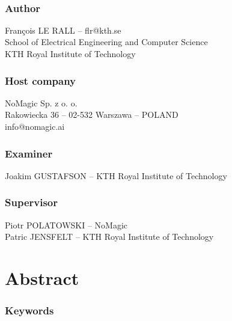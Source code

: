 \documentclass[/home/francois/latex/report/main.tex]{subfiles}
\begin{document}
\newpage
\thispagestyle{plain}

~

\vfill

{ 
	\subsection*{Author}
	François LE RALL – flr@kth.se\\
	School of Electrical Engineering and Computer Science\\
	KTH Royal Institute of Technology

	\subsection*{Host company}
	NoMagic Sp. z o. o.\\
	Rakowiecka 36 – 02-532 Warszawa – POLAND\\
	info@nomagic.ai

	\subsection*{Examiner}
	Joakim GUSTAFSON – KTH Royal Institute of Technology

	\subsection*{Supervisor}
	Piotr POLATOWSKI – NoMagic\\
	Patric JENSFELT – KTH Royal Institute of Technology
	~
}


\newpage
\thispagestyle{plain}
\chapter*{Abstract}

%
%

\subsection*{Keywords}
\end{document}
